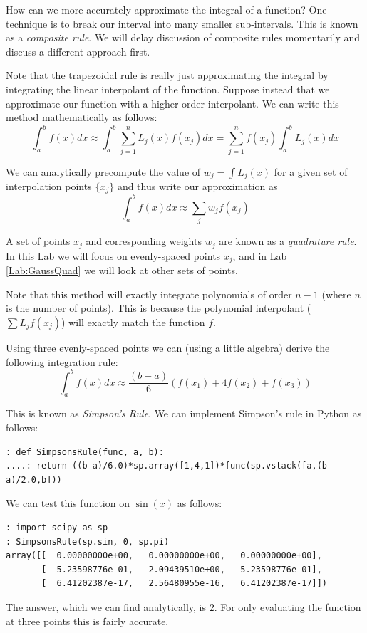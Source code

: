 How can we more accurately approximate the integral of a function? One technique is to break our interval into many smaller sub-intervals. This is known as a \emph{composite rule}. We will delay discussion of composite rules momentarily and discuss a different approach first.

Note that the trapezoidal rule is really just approximating the integral by integrating the linear interpolant of the function. Suppose instead that we approximate our function with a higher-order interpolant. We can write this method mathematically as follows:
\[
\int_a^b f(x) dx \approx \int_a^b \sum_{j=1}^n L_j(x)f(x_j) dx = \sum_{j=1}^n f(x_j)\int_a^b L_j(x) dx
\]

We can analytically precompute the value of $w_j = \int L_j(x)$ for a given set of interpolation points $\{x_j\}$ and thus write our approximation as
\[
\int_a^b f(x) dx \approx \sum_j w_j f(x_j)
\]

A set of points $x_j$ and corresponding weights $w_j$ are known as a \emph{quadrature rule}. In this Lab we will focus on evenly-spaced points $x_j$, and in Lab \ref{Lab:GaussQuad} we will look at other sets of points.

Note that this method will exactly integrate polynomials of order $n-1$ (where $n$ is the number of points). This is because the polynomial interpolant ($\sum L_j f(x_j)$) will exactly match the function $f$.

Using three evenly-spaced points we can (using a little algebra) derive the following integration rule:
\[
\int_a^b f(x) dx \approx \frac{(b-a)}{6}\left(f(x_1) + 4 f(x_2) + f(x_3)\right)
\]

This is known as \emph{Simpson's Rule}. We can implement Simpson's rule in Python as follows:
\begin{lstlisting}[style=python]
: def SimpsonsRule(func, a, b):
....: return ((b-a)/6.0)*sp.array([1,4,1])*func(sp.vstack([a,(b-a)/2.0,b]))
\end{lstlisting}


We can test this function on $\sin(x)$ as follows:
\begin{lstlisting}[style=python]
: import scipy as sp
: SimpsonsRule(sp.sin, 0, sp.pi)
array([[  0.00000000e+00,   0.00000000e+00,   0.00000000e+00],
       [  5.23598776e-01,   2.09439510e+00,   5.23598776e-01],
       [  6.41202387e-17,   2.56480955e-16,   6.41202387e-17]])
\end{lstlisting}


The answer, which we can find analytically, is $2$. For only evaluating the function at three points this is fairly accurate.

